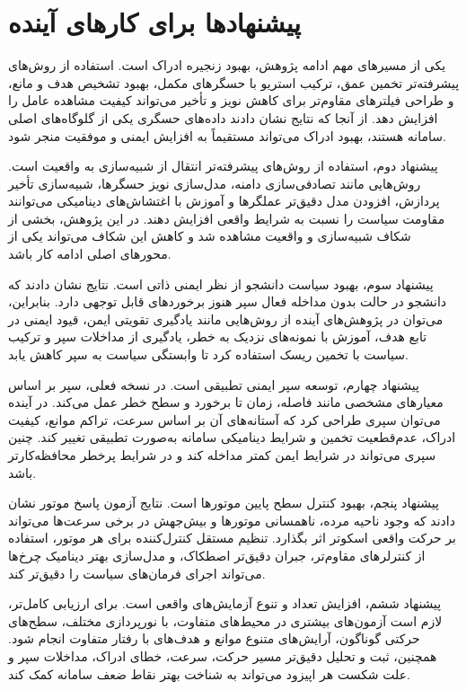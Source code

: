 \section{پیشنهادها برای کارهای آینده}
\label{sec:future_work}

یکی از مسیرهای مهم ادامه پژوهش، بهبود زنجیره ادراک است. استفاده از روش‌های پیشرفته‌تر تخمین عمق، ترکیب استریو با حسگرهای مکمل، بهبود تشخیص هدف و مانع، و طراحی فیلترهای مقاوم‌تر برای کاهش نویز و تأخیر می‌تواند کیفیت مشاهده عامل را افزایش دهد. از آنجا که نتایج نشان دادند داده‌های حسگری یکی از گلوگاه‌های اصلی سامانه هستند، بهبود ادراک می‌تواند مستقیماً به افزایش ایمنی و موفقیت منجر شود.

پیشنهاد دوم، استفاده از روش‌های پیشرفته‌تر انتقال از شبیه‌سازی به واقعیت است. روش‌هایی مانند تصادفی‌سازی دامنه، مدل‌سازی نویز حسگرها، شبیه‌سازی تأخیر پردازش، افزودن مدل دقیق‌تر عملگرها و آموزش با اغتشاش‌های دینامیکی می‌توانند مقاومت سیاست را نسبت به شرایط واقعی افزایش دهند. در این پژوهش، بخشی از شکاف شبیه‌سازی و واقعیت مشاهده شد و کاهش این شکاف می‌تواند یکی از محورهای اصلی ادامه کار باشد.

پیشنهاد سوم، بهبود سیاست دانشجو از نظر ایمنی ذاتی است. نتایج نشان دادند که دانشجو در حالت بدون مداخله فعال سپر هنوز برخوردهای قابل توجهی دارد. بنابراین، می‌توان در پژوهش‌های آینده از روش‌هایی مانند یادگیری تقویتی ایمن، قیود ایمنی در تابع هدف، آموزش با نمونه‌های نزدیک به خطر، یادگیری از مداخلات سپر و ترکیب سیاست با تخمین ریسک استفاده کرد تا وابستگی سیاست به سپر کاهش یابد.

پیشنهاد چهارم، توسعه سپر ایمنی تطبیقی است. در نسخه فعلی، سپر بر اساس معیارهای مشخصی مانند فاصله، زمان تا برخورد و سطح خطر عمل می‌کند. در آینده می‌توان سپری طراحی کرد که آستانه‌های آن بر اساس سرعت، تراکم موانع، کیفیت ادراک، عدم‌قطعیت تخمین و شرایط دینامیکی سامانه به‌صورت تطبیقی تغییر کند. چنین سپری می‌تواند در شرایط ایمن کمتر مداخله کند و در شرایط پرخطر محافظه‌کارتر باشد.

پیشنهاد پنجم، بهبود کنترل سطح پایین موتورها است. نتایج آزمون پاسخ موتور نشان دادند که وجود ناحیه مرده، ناهمسانی موتورها و بیش‌جهش در برخی سرعت‌ها می‌تواند بر حرکت واقعی اسکوتر اثر بگذارد. تنظیم مستقل کنترل‌کننده برای هر موتور، استفاده از کنترلرهای مقاوم‌تر، جبران دقیق‌تر اصطکاک، و مدل‌سازی بهتر دینامیک چرخ‌ها می‌تواند اجرای فرمان‌های سیاست را دقیق‌تر کند.

پیشنهاد ششم، افزایش تعداد و تنوع آزمایش‌های واقعی است. برای ارزیابی کامل‌تر، لازم است آزمون‌های بیشتری در محیط‌های متفاوت، با نورپردازی مختلف، سطح‌های حرکتی گوناگون، آرایش‌های متنوع موانع و هدف‌های با رفتار متفاوت انجام شود. همچنین، ثبت و تحلیل دقیق‌تر مسیر حرکت، سرعت، خطای ادراک، مداخلات سپر و علت شکست هر اپیزود می‌تواند به شناخت بهتر نقاط ضعف سامانه کمک کند.

